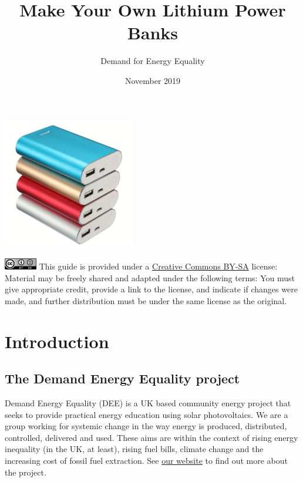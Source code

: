 \documentclass{article}
\title{Make Your Own Lithium Power Banks}
\author{Demand for Energy Equality}
\date{November 2019}
\theoremstyle{definition}
\theoremstyle{definition}
\theoremstyle{remark}
\begin{document}
 
\maketitle{}

\begin{center}
  \includegraphics[]{Images/image_0_1_(power_banks).png}
\end{center}

\vfill
  
\includegraphics[]{Images/image_0_2_(license).png} \newline
This guide is provided under a \href{https://creativecommons.org/licenses/by-sa/4.0/legalcode}{Creative Commons BY-SA} license: \newline
Material may be freely shared and adapted under the following terms: You must give appropriate credit, provide a link to the license, and indicate if changes were made, and further distribution must be under the same license as the original.

\newpage

\tableofcontents

\newpage

\section{Introduction} %
\label{sec:introduction}

  \subsection{The Demand Energy Equality project} %
  \label{sub:the_demand_energy_equality_project}

    Demand Energy Equality (DEE) is a UK based community energy project that seeks to provide practical energy education using solar photovoltaics. We are a group working for systemic change in the way energy is produced, distributed, controlled, delivered and used. These aims are within the context of rising energy inequality (in the UK, at least), rising fuel bills, climate change and the increasing cost of fossil fuel extraction. See \href{https://www.demandenergyequality.org/about/}{our website} to find out more about the project.
    
\end{document}
